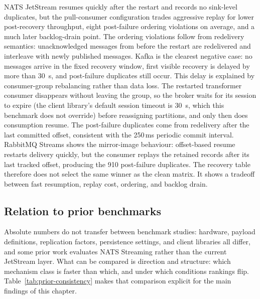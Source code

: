 NATS JetStream resumes quickly after the restart and records no sink-level duplicates, but the pull-consumer configuration trades aggressive replay for lower post-recovery throughput, eight post-failure ordering violations on average, and a much later backlog-drain point. The ordering violations follow from redelivery semantics: unacknowledged messages from before the restart are redelivered and interleave with newly published messages. Kafka is the clearest negative case: no messages arrive in the fixed recovery window, first visible recovery is delayed by more than 30~s, and post-failure duplicates still occur. This delay is explained by consumer-group rebalancing rather than data loss. The restarted transformer consumer disappears without leaving the group, so the broker waits for its session to expire (the client library's default session timeout is 30~s, which this benchmark does not override) before reassigning partitions, and only then does consumption resume. The post-failure duplicates come from redelivery after the last committed offset, consistent with the 250\,ms periodic commit interval. RabbitMQ Streams shows the mirror-image behaviour: offset-based resume restarts delivery quickly, but the consumer replays the retained records after its last tracked offset, producing the 910 post-failure duplicates. The recovery table therefore does not select the same winner as the clean matrix. It shows a tradeoff between fast resumption, replay cost, ordering, and backlog drain.

\subsection{Relation to prior benchmarks}\label{sec:rq1-prior}

Absolute numbers do not transfer between benchmark studies: hardware, payload definitions, replication factors, persistence settings, and client libraries all differ, and some prior work evaluates NATS Streaming rather than the current JetStream layer. What can be compared is direction and structure: which mechanism class is faster than which, and under which conditions rankings flip. Table~\ref{tab:prior-consistency} makes that comparison explicit for the main findings of this chapter.


